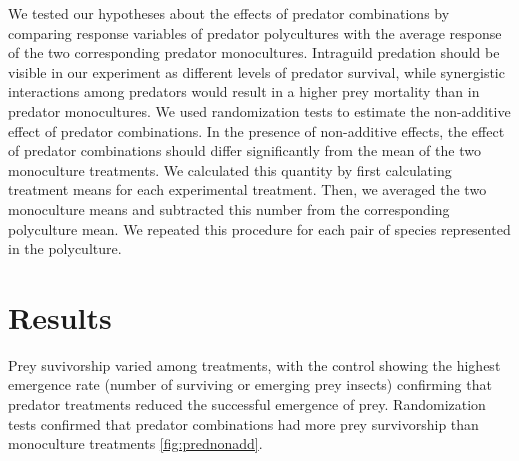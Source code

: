 \documentclass[10pt]{article}
\begin{document}
\begin{spacing}{2}
We tested our hypotheses about the effects of predator combinations by
comparing response variables of predator polycultures with the average
response of the two corresponding predator monocultures. Intraguild
predation should be visible in our experiment as different levels of
predator survival, while synergistic interactions among predators
would result in a higher prey mortality than in predator
monocultures. We used randomization tests to estimate the non-additive
effect of predator combinations.  In the presence of non-additive
effects, the effect of predator combinations should differ
significantly from the mean of the two monoculture treatments.  We
calculated this quantity by first calculating treatment means for each
experimental treatment.  Then, we averaged the two monoculture means
and subtracted this number from the corresponding polyculture mean.
We repeated this procedure for each pair of species represented in the
polyculture.

\section{Results}

Prey suvivorship varied among treatments, with the control showing the
highest emergence rate (number of surviving or emerging prey insects)
confirming that predator treatments reduced the successful emergence
of prey. Randomization tests confirmed that predator combinations had
more prey survivorship than monoculture treatments \ref{fig:prednonadd}.


\end{spacing}
\end{document}
